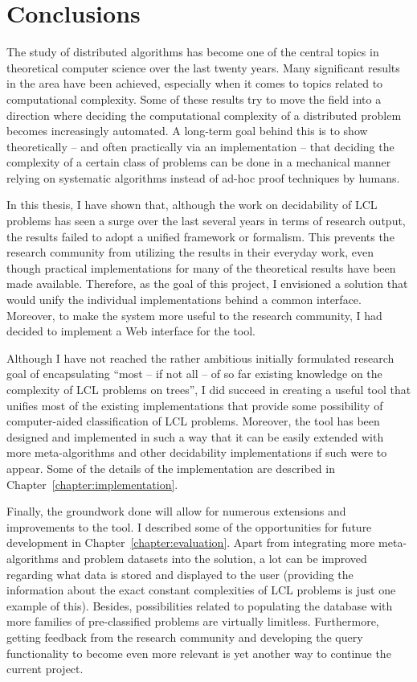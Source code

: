 \chapter{Conclusions}
\label{chapter:conclusions}

The study of distributed algorithms has become
one of the central topics in theoretical computer science
over the last twenty years. Many significant results in the area
have been achieved, especially when it comes to topics related
to computational complexity. Some of these results
try to move the field into a direction where deciding the
computational complexity of a distributed problem becomes
increasingly automated. A long-term goal behind this is
to show theoretically -- and often practically via an
implementation -- that deciding the complexity of a certain class
of problems can be done in a mechanical manner relying
on systematic algorithms instead of ad-hoc proof techniques
by humans.

In this thesis, I have shown that, although the work on
decidability of LCL problems has seen a surge over the last
several years in terms of research output, the results
failed to adopt a unified framework or formalism. This
prevents the research community from utilizing the
results in their everyday work, even though practical
implementations for many of the theoretical results have been
made available. Therefore, as the goal of this project, I
envisioned a solution that would unify the individual
implementations behind a common interface. Moreover, to make
the system more useful to the research community, I had decided
to implement a Web interface for the tool.

Although I have not reached the rather ambitious initially formulated
research goal of encapsulating ``most -- if not
all -- of
so far existing knowledge on the complexity of LCL
problems on trees'', I did succeed in creating a useful
tool that unifies most of the existing implementations that
provide some possibility of computer-aided classification of LCL
problems. Moreover, the tool has been designed and implemented in
such a way that it can be easily extended with more meta-algorithms
and other decidability implementations if such were to appear.
Some of the details of the implementation are described
in Chapter~\ref{chapter:implementation}.

Finally, the groundwork done will allow for numerous
extensions and improvements to the tool. I described
some of the opportunities for future development in
Chapter~\ref{chapter:evaluation}. Apart from
integrating more meta-algorithms and problem datasets into the
solution, a lot can be improved regarding what data
is stored and displayed to the user
(providing the information about the exact constant complexities of
LCL problems is just one example of this). Besides,
possibilities related to populating the database with more
families of pre-classified problems are virtually limitless.
Furthermore, getting feedback from the research community and
developing the query functionality to become even more
relevant is yet another way to continue the current
project.

